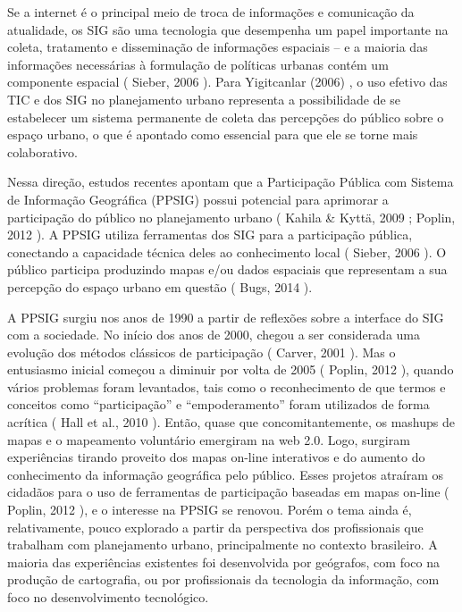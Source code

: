 \documentclass{article}
\begin{document}
Se a internet é o principal meio de troca de informações e comunicação da atualidade,
				os SIG são uma tecnologia que desempenha um papel importante na coleta, tratamento e
				disseminação de informações espaciais – e a maioria das informações necessárias à
				formulação de políticas urbanas contém um componente espacial (%
Sieber, 2006%
). Para %
Yigitcanlar (2006)%
, o uso efetivo das TIC e dos SIG no planejamento
				urbano representa a possibilidade de se estabelecer um sistema permanente de coleta
				das percepções do público sobre o espaço urbano, o que é apontado como essencial
				para que ele se torne mais colaborativo.

Nessa direção, estudos recentes apontam que a Participação Pública com Sistema de
				Informação Geográfica (PPSIG) possui potencial para aprimorar a participação do
				público no planejamento urbano (%
Kahila \& Kyttä,
					2009%
; %
Poplin, 2012%
). A PPSIG
				utiliza ferramentas dos SIG para a participação pública, conectando a capacidade
				técnica deles ao conhecimento local (%
Sieber,
					2006%
). O público participa produzindo mapas e/ou dados espaciais que
				representam a sua percepção do espaço urbano em questão (%
Bugs, 2014%
).

A PPSIG surgiu nos anos de 1990 a partir de reflexões sobre a interface do SIG com a
				sociedade. No início dos anos de 2000, chegou a ser considerada uma evolução dos
				métodos clássicos de participação (%
Carver,
					2001%
). Mas o entusiasmo inicial começou a diminuir por volta de 2005
					(%
Poplin, 2012%
), quando vários problemas
				foram levantados, tais como o reconhecimento de que termos e conceitos como
				“participação” e “empoderamento” foram utilizados de forma acrítica (%
Hall et al., 2010%
). Então, quase que
				concomitantemente, os %
mashups%
 de mapas e o mapeamento voluntário
				emergiram na web 2.0. Logo, surgiram experiências tirando proveito dos mapas on-line
				interativos e do aumento do conhecimento da informação geográfica pelo público.
				Esses projetos atraíram os cidadãos para o uso de ferramentas de participação
				baseadas em mapas on-line (%
Poplin, 2012%
), e
				o interesse na PPSIG se renovou. Porém o tema ainda é, relativamente, pouco
				explorado a partir da perspectiva dos profissionais que trabalham com planejamento
				urbano, principalmente no contexto brasileiro. A maioria das experiências existentes
				foi desenvolvida por geógrafos, com foco na produção de cartografia, ou por
				profissionais da tecnologia da informação, com foco no desenvolvimento
				tecnológico.
\end{document}
